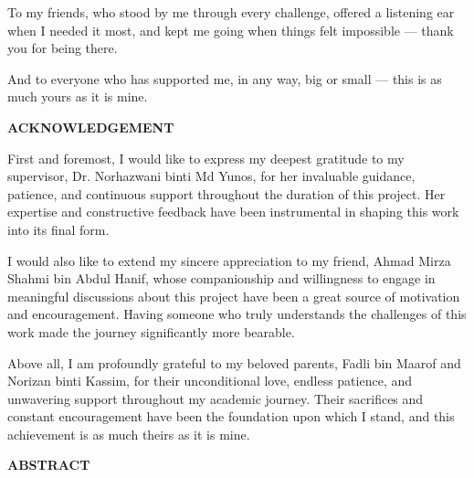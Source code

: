 \documentclass[12pt, oneside]{article} %
\begin{document}
To my friends, who stood by me through every challenge, offered a listening ear when I needed it most, and kept me going when things felt impossible --- thank you for being there.

And to everyone who has supported me, in any way, big or small --- this is as much yours as it is mine.



\vfill \null

\newpage






\begin{center}
{}
\textbf{ACKNOWLEDGEMENT}
\end{center}


\vspace{1cm}
First and foremost, I would like to express my deepest gratitude to my supervisor, Dr. Norhazwani binti Md Yunos, for her invaluable guidance, patience, and continuous support throughout the duration of this project. Her expertise and constructive feedback have been instrumental in shaping this work into its final form.

I would also like to extend my sincere appreciation to my friend, Ahmad Mirza Shahmi bin Abdul Hanif, whose companionship and willingness to engage in meaningful discussions about this project have been a great source of motivation and encouragement. Having someone who truly understands the challenges of this work made the journey significantly more bearable.

Above all, I am profoundly grateful to my beloved parents, Fadli bin Maarof and Norizan binti Kassim, for their unconditional love, endless patience, and unwavering support throughout my academic journey. Their sacrifices and constant encouragement have been the foundation upon which I stand, and this achievement is as much theirs as it is mine.



\vfill \null

\newpage






\begin{center}
\vfill \null
{}
{}
\textbf{ABSTRACT}
\end{center}
\end{document}
